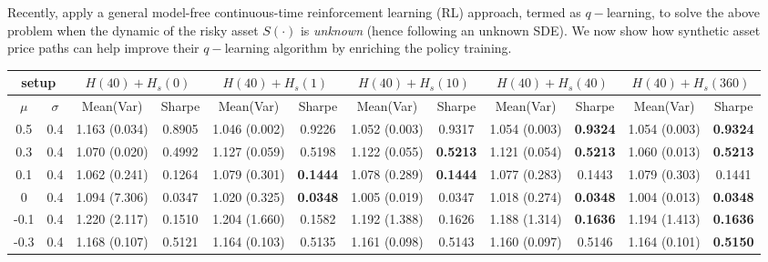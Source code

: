 \documentclass[11pt]{article}
\newcommand{\tbf}{\textbf}
\begin{document}
Recently, \cite{jia2023q} apply a general model-free continuous-time reinforcement learning (RL) approach, termed as $q-$learning, to solve the above problem when the dynamic of the risky asset $S(\cdot)$ is {\it unknown} (hence following an unknown SDE). 
We now show how synthetic asset price paths can help improve their $q-$learning algorithm by enriching the policy training.



\begin{table}
    \centering
    \small
    \addtolength{\tabcolsep}{-4.5pt}
    \begin{tabular}{c c|| c c | c c | c c | c c | c c}
    \toprule
       \multicolumn{2}{c||}{setup}  & \multicolumn{2}{c|}{$H (40) + H_s(0)$} & \multicolumn{2}{c|}{$H (40) + H_s(1)$} & \multicolumn{2}{c|}{$H (40) + H_s(10)$} & \multicolumn{2}{c}{$H (40) + H_s(40)$} & \multicolumn{2}{c}{$H (40) + H_s(360)$} \\\hline
        $\mu$ & $\sigma$ & Mean(Var) & Sharpe &   Mean(Var) & Sharpe & Mean(Var) & Sharpe & Mean(Var) & Sharpe & Mean(Var) & Sharpe  \\\hline
        0.5 & 0.4 
        & 1.163 (0.034) & 0.8905 & 1.046 (0.002) & 0.9226 & 1.052 (0.003) & 0.9317 & 1.054 (0.003) & \tbf{0.9324} & 1.054 (0.003) & \tbf{0.9324}
        \\

        0.3 & 0.4 
        & 1.070 (0.020) & 0.4992 & 1.127 (0.059) & 0.5198 & 1.122 (0.055) & \textbf{0.5213} & 1.121 (0.054) & \textbf{0.5213} & 1.060 (0.013) & \textbf{0.5213}
        \\

        0.1 & 0.4 
        & 1.062 (0.241) & 0.1264 & 1.079 (0.301) & \tbf{0.1444} & 1.078 (0.289) & \tbf{0.1444} & 1.077 (0.283) & 0.1443 & 1.079 (0.303) & 0.1441
        \\

        0 & 0.4 
        & 1.094 (7.306) & 0.0347 & 1.020 (0.325) & \textbf{0.0348} & 1.005 (0.019) & 0.0347 & 1.018 (0.274) & \textbf{0.0348} & 1.004 (0.013) & \textbf{0.0348}
        \\

        -0.1 & 0.4
        & 1.220 (2.117) & 0.1510 & 1.204 (1.660) & 0.1582 & 1.192 (1.388) & 0.1626 & 1.188 (1.314) & \tbf{0.1636} & 1.194 (1.413) & \tbf{0.1636}
        \\

        -0.3 & 0.4
        & 1.168 (0.107) & 0.5121 & 1.164 (0.103) & 0.5135 & 1.161 (0.098) & 0.5143 & 1.160 (0.097) & 0.5146 & 1.164 (0.101) & \tbf{0.5150}
        \\


\end{tabular}
\end{table}
\end{document}

